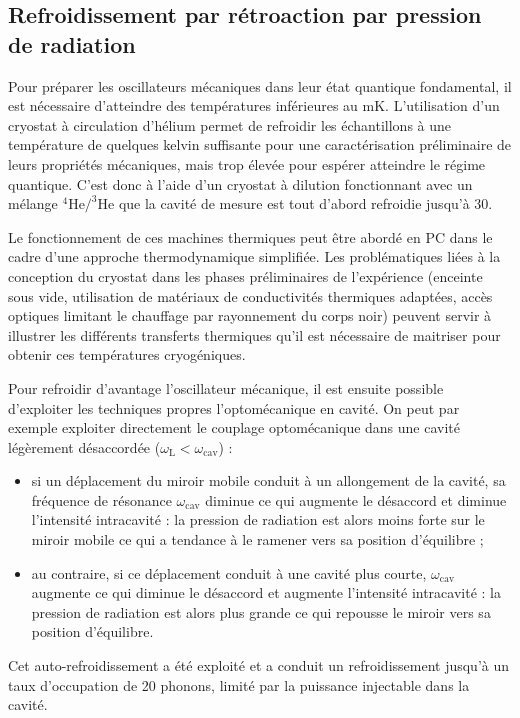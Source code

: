 \documentclass[12pt,a4paper]{article}
\newenvironment{mep}{%
\addcontentsline{ldf}{figure}{0}%
\begin{mep_env}
\small}
{\end{mep_env}}
\begin{document}
\subsection{Refroidissement par rétroaction par pression de radiation}

Pour préparer les oscillateurs mécaniques dans leur état quantique fondamental, il est nécessaire d'atteindre des températures inférieures au mK.
L'utilisation d'un cryostat à circulation d'hélium permet de refroidir les échantillons à une température de quelques kelvin suffisante pour une caractérisation préliminaire de leurs propriétés mécaniques, mais trop élevée pour espérer atteindre le régime quantique.
C'est donc à l'aide d'un cryostat à dilution fonctionnant avec un mélange $\mathrm{^4He/^3He}$ que la cavité de mesure est tout d'abord refroidie jusqu'à \unit{30}{\milli\kelvin}.

\begin{mep}
Le fonctionnement de ces machines thermiques peut être abordé en PC dans le cadre d'une approche thermodynamique simplifiée.
Les problématiques liées à la conception du cryostat dans les phases préliminaires de l'expérience (enceinte sous vide, utilisation de matériaux de conductivités thermiques adaptées, accès optiques limitant le chauffage par rayonnement du corps noir) peuvent servir à illustrer les différents transferts thermiques qu'il est nécessaire de maitriser pour obtenir ces températures cryogéniques.
\end{mep}

Pour refroidir d'avantage l'oscillateur mécanique, il est ensuite possible d'exploiter les techniques propres l'optomécanique en cavité.
On peut par exemple exploiter directement le couplage optomécanique dans une cavité légèrement désaccordée ($\omega_\mathrm{L}<\omega_\mathrm{cav}$) :
\begin{itemize}
\item si un déplacement du miroir mobile conduit à un allongement de la cavité, sa fréquence de résonance $\omega_\mathrm{cav}$ diminue ce qui augmente le désaccord et diminue l'intensité intracavité : la pression de radiation est alors moins forte sur le miroir mobile ce qui a tendance à le ramener vers sa position d'équilibre ;
\item au contraire, si ce déplacement conduit à une cavité plus courte, $\omega_\mathrm{cav}$ augmente ce qui diminue le désaccord et augmente l'intensité intracavité : la pression de radiation est alors plus grande ce qui repousse le miroir vers sa position d'équilibre.
\end{itemize}
Cet auto-refroidissement a été exploité et a conduit un refroidissement jusqu'à un taux d'occupation de 20 phonons, limité par la puissance injectable dans la cavité.
\end{document}
